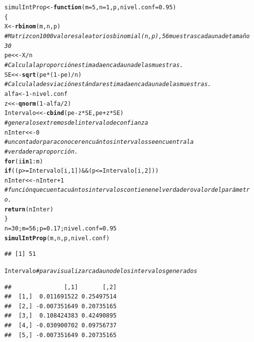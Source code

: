 \documentclass[12pt,letterpaper]{article}\usepackage[]{graphicx}\usepackage[]{color}
\makeatletter
\newcommand{\hlnum}[1]{\textcolor[rgb]{0.686,0.059,0.569}{#1}}%
\newcommand{\hlcom}[1]{\textcolor[rgb]{0.678,0.584,0.686}{\textit{#1}}}%
\newcommand{\hlopt}[1]{\textcolor[rgb]{0,0,0}{#1}}%
\newcommand{\hlstd}[1]{\textcolor[rgb]{0.345,0.345,0.345}{#1}}%
\newcommand{\hlkwa}[1]{\textcolor[rgb]{0.161,0.373,0.58}{\textbf{#1}}}%
\newcommand{\hlkwb}[1]{\textcolor[rgb]{0.69,0.353,0.396}{#1}}%
\newcommand{\hlkwc}[1]{\textcolor[rgb]{0.333,0.667,0.333}{#1}}%
\newcommand{\hlkwd}[1]{\textcolor[rgb]{0.737,0.353,0.396}{\textbf{#1}}}%
\newenvironment{kframe}{%
 \def\at@end@of@kframe{}%
 \ifinner\ifhmode%
  \def\at@end@of@kframe{\end{minipage}}%
  \begin{minipage}{\columnwidth}%
 \fi\fi%
 \def\FrameCommand##1{\hskip\@totalleftmargin \hskip-\fboxsep
 \colorbox{shadecolor}{##1}\hskip-\fboxsep
     \hskip-\linewidth \hskip-\@totalleftmargin \hskip\columnwidth}%
 \MakeFramed {\advance\hsize-\width
   \@totalleftmargin\z@ \linewidth\hsize
   \@setminipage}}%
 {\par\unskip\endMakeFramed%
 \at@end@of@kframe}
\newenvironment{knitrout}{}{} %
\makeatother
\begin{document}
\begin{knitrout}
\color{fgcolor}\begin{kframe}
\begin{alltt}
\hlstd{simulIntProp} \hlkwb{<-} \hlkwa{function}\hlstd{(}\hlkwc{m}\hlstd{=}\hlnum{5}\hlstd{,} \hlkwc{n}\hlstd{=}\hlnum{1}\hlstd{,} \hlkwc{p}\hlstd{,} \hlkwc{nivel.conf}\hlstd{=}\hlnum{0.95}\hlstd{)}
\hlstd{\{}
\hlstd{X} \hlkwb{<-} \hlkwd{rbinom}\hlstd{(m, n, p)}
\hlcom{# Matriz con 1000 valores aleatorios binomial(n,p), 56 muestras cada una de tamaño 30 }
\hlstd{pe} \hlkwb{<<-} \hlstd{X}\hlopt{/}\hlstd{n}
 \hlcom{# Calcula la proporción estimada en cada una de las muestras. }
\hlstd{SE} \hlkwb{<<-} \hlkwd{sqrt}\hlstd{(pe}\hlopt{*}\hlstd{(}\hlnum{1}\hlopt{-}\hlstd{pe)}\hlopt{/}\hlstd{n)}
\hlcom{# Calcula la desviación estándarestimada en cada una de las muestras. }
\hlstd{alfa} \hlkwb{<-} \hlnum{1}\hlopt{-}\hlstd{nivel.conf}
\hlstd{z} \hlkwb{<<-} \hlkwd{qnorm}\hlstd{(}\hlnum{1}\hlopt{-}\hlstd{alfa}\hlopt{/}\hlnum{2}\hlstd{)}
\hlstd{Intervalo} \hlkwb{<<-} \hlkwd{cbind}\hlstd{(pe} \hlopt{-} \hlstd{z}\hlopt{*}\hlstd{SE, pe} \hlopt{+} \hlstd{z}\hlopt{*}\hlstd{SE)}
\hlcom{# genera los extremos del intervalo de confianza }
\hlstd{nInter} \hlkwb{<<-} \hlnum{0}
\hlcom{# un contador para conocer en cuántos intervalos se encuentra la }
\hlcom{#verdadera proporción. }
\hlkwa{for}\hlstd{(i} \hlkwa{in} \hlnum{1}\hlopt{:}\hlstd{m)}
\hlkwa{if} \hlstd{((p} \hlopt{>=} \hlstd{Intervalo[i,} \hlnum{1}\hlstd{])} \hlopt{&&} \hlstd{(p} \hlopt{<=} \hlstd{Intervalo[i,} \hlnum{2}\hlstd{]))}
\hlstd{nInter} \hlkwb{<<-} \hlstd{nInter} \hlopt{+} \hlnum{1}
\hlcom{# función que cuenta cuántos intervalos contienen el verdadero valor del parámetro. }
\hlkwd{return}\hlstd{(nInter)}
\hlstd{\}}
\hlstd{n}\hlkwb{=}\hlnum{30}\hlstd{; m}\hlkwb{=} \hlnum{56}\hlstd{; p}\hlkwb{=}\hlnum{0.17}\hlstd{; nivel.conf}\hlkwb{=}\hlnum{0.95}
\hlkwd{simulIntProp}\hlstd{(m, n, p, nivel.conf)}
\end{alltt}
\begin{verbatim}
## [1] 51
\end{verbatim}
\begin{alltt}
\hlstd{Intervalo} \hlcom{# para visualizar cada uno de los intervalos generados }
\end{alltt}
\begin{verbatim}
##               [,1]       [,2]
##  [1,]  0.011691522 0.25497514
##  [2,] -0.007351649 0.20735165
##  [3,]  0.108424383 0.42490895
##  [4,] -0.030900702 0.09756737
##  [5,] -0.007351649 0.20735165

\end{verbatim}
\end{kframe}
\end{knitrout}
\end{document}
